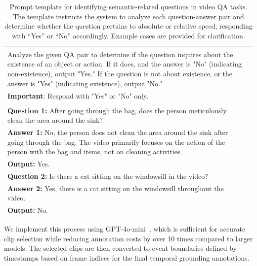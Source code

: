\begin{table}[t!]\centering
\caption{Prompt template for identifying semantic-related questions in video QA tasks. The template instructs the system to analyze each question-answer pair and determine whether the question pertains to absolute or relative speed, responding with ``Yes'' or ``No'' accordingly. Example cases are provided for clarification.}
\label{tab:temporal_grounding_prompt_v2}\vspace{2mm}
\begin{minipage}{\linewidth}\vspace{0mm}
\centering
\begin{tcolorbox} 
\centering
\footnotesize
\begin{tabular}{p{} c}
\normalsize\color{blue}{\textbf{Task:}} &\\
Analyze the given QA pair to determine if the question inquires about the existence of an object or action. If it does, and the answer is "No" (indicating non-existence), output "Yes." If the question is not about existence, or the answer is "Yes" (indicating existence), output "No."  & \\
\textbf{Important}: Respond with "Yes" or "No" only.  & \\
\midrule
\normalsize\color{blue}{\textbf{Example:}} & \\
\textbf{Question 1:} After going through the bag, does the person meticulously clean the area around the sink?  \\
\textbf{Answer 1:} No, the person does not clean the area around the sink after going through the bag. The video primarily focuses on the action of the person with the bag and items, not on cleaning activities. \\
\textbf{Output:} Yes. \\
\textbf{Question 2:} Is there a cat sitting on the windowsill in the video?  \\
\textbf{Answer 2:} Yes, there is a cat sitting on the windowsill throughout the video. \\
\textbf{Output:} No. \\
\midrule

\end{tabular}
\end{tcolorbox}
\vspace{-2mm}
\end{minipage}
\end{table}



We implement this process using GPT-4o-mini~\cite{openai2024gpt4o}, which is sufficient for accurate clip selection while reducing annotation costs by over 10 times compared to larger models. The selected clips are then converted to event boundaries defined by timestamps based on frame indices for the final temporal grounding annotations.


